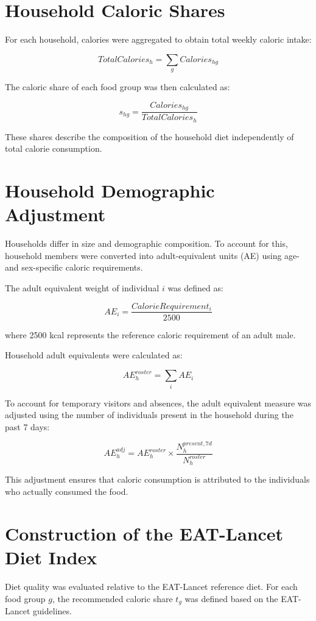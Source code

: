 \documentclass{article}
\begin{document}
\section{Household Caloric Shares}

For each household, calories were aggregated to obtain total weekly caloric intake:

\[
TotalCalories_h = \sum_g Calories_{hg}
\]

The caloric share of each food group was then calculated as:

\[
s_{hg} = \frac{Calories_{hg}}{TotalCalories_h}
\]

These shares describe the composition of the household diet independently of total calorie consumption.

\section{Household Demographic Adjustment}

Households differ in size and demographic composition. To account for this, household members were converted into adult-equivalent units (AE) using age- and sex-specific caloric requirements.

The adult equivalent weight of individual $i$ was defined as:

\[
AE_i = \frac{CalorieRequirement_i}{2500}
\]

where 2500 kcal represents the reference caloric requirement of an adult male.

Household adult equivalents were calculated as:

\[
AE_h^{roster} = \sum_i AE_i
\]

To account for temporary visitors and absences, the adult equivalent measure was adjusted using the number of individuals present in the household during the past 7 days:

\[
AE_h^{adj} = AE_h^{roster} \times 
\frac{N_h^{present,7d}}{N_h^{roster}}
\]

This adjustment ensures that caloric consumption is attributed to the individuals who actually consumed the food.

\section{Construction of the EAT-Lancet Diet Index}

Diet quality was evaluated relative to the EAT-Lancet reference diet. For each food group $g$, the recommended caloric share $t_g$ was defined based on the EAT-Lancet guidelines.
\end{document}
